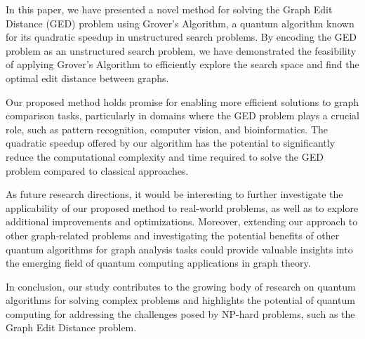 In this paper, we have presented a novel method for solving the Graph Edit Distance (GED) problem using Grover's Algorithm, a quantum algorithm known for its quadratic speedup in unstructured search problems. By encoding the GED problem as an unstructured search problem, we have demonstrated the feasibility of applying Grover's Algorithm to efficiently explore the search space and find the optimal edit distance between graphs.

Our proposed method holds promise for enabling more efficient solutions to graph comparison tasks, particularly in domains where the GED problem plays a crucial role, such as pattern recognition, computer vision, and bioinformatics. The quadratic speedup offered by our algorithm has the potential to significantly reduce the computational complexity and time required to solve the GED problem compared to classical approaches.

As future research directions, it would be interesting to further investigate the applicability of our proposed method to real-world problems, as well as to explore additional improvements and optimizations. Moreover, extending our approach to other graph-related problems and investigating the potential benefits of other quantum algorithms for graph analysis tasks could provide valuable insights into the emerging field of quantum computing applications in graph theory.

In conclusion, our study contributes to the growing body of research on quantum algorithms for solving complex problems and highlights the potential of quantum computing for addressing the challenges posed by NP-hard problems, such as the Graph Edit Distance problem.

